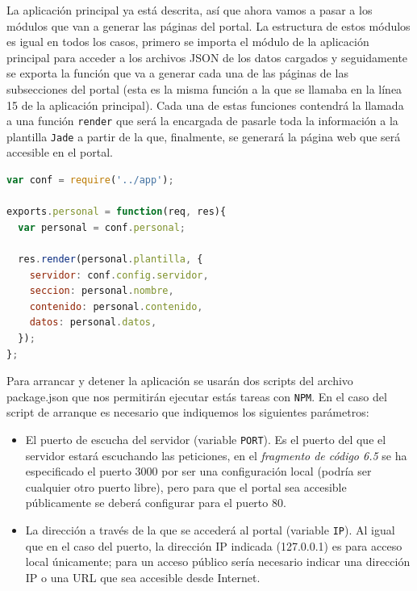 La aplicación principal ya está descrita, así que ahora vamos a pasar a los módulos que van a generar las páginas del portal. La estructura de estos módulos es igual en todos los casos, primero se importa el módulo de la aplicación principal para acceder a los archivos JSON de los datos cargados y seguidamente se exporta la función que va a generar cada una de las páginas de las subsecciones del portal (esta es la misma función a la que se llamaba en la línea 15 de la aplicación principal). Cada una de estas funciones contendrá la llamada a una función {\tt render} que será la encargada de pasarle toda la información a la plantilla {\tt Jade} a partir de la que, finalmente, se generará la página web que será accesible en el portal.

\newpage 

\begin{lstlisting}[language=javascript,caption={Archivo administracion.js},label={lst:adminjs}]
var conf = require('../app');

exports.personal = function(req, res){
  var personal = conf.personal;

  res.render(personal.plantilla, {
    servidor: conf.config.servidor,
    seccion: personal.nombre,
    contenido: personal.contenido,
    datos: personal.datos,
  });
};
\end{lstlisting}

Para arrancar y detener la aplicación se usarán dos scripts del archivo {\\package.json} que nos permitirán ejecutar estás tareas con {\tt NPM}. En el caso del script de arranque es necesario que indiquemos los siguientes parámetros:

\begin{itemize}
	\item  El puerto de escucha del servidor (variable {\tt PORT}). Es el puerto del que el servidor estará escuchando las peticiones, en el \textit{fragmento de código 6.5} se ha especificado el puerto 3000 por ser una configuración local (podría ser cualquier otro puerto libre), pero para que el portal sea accesible públicamente se deberá configurar para el puerto 80.
	\item La dirección a través de la que se accederá al portal (variable {\tt IP}). Al igual que en el caso del puerto, la dirección IP indicada (127.0.0.1) es para acceso local únicamente; para un acceso público sería necesario indicar una dirección IP o una URL que sea accesible desde Internet.
\end{itemize}

